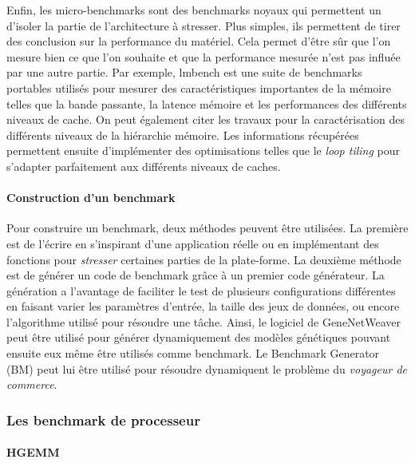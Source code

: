     Enfin, les micro-benchmarks sont des benchmarks noyaux qui permettent un d’isoler la partie de l’architecture à stresser. Plus simples, ils permettent de tirer des conclusion sur la performance du matériel. Cela permet d’être sûr que l’on mesure bien ce que l’on souhaite et que la performance mesurée n’est pas influée par une autre partie.
    Par exemple, lmbench \cite{HPC:lmbench} est une suite de benchmarks portables utilisés pour mesurer des caractéristiques importantes de la mémoire telles que la bande passante, la latence mémoire et les performances des différents niveaux de cache.
    On peut également citer les travaux \cite{Saavedra1995, gonzalez2010servet} pour la caractérisation des différents niveaux de la hiérarchie mémoire. Les informations récupérées permettent ensuite d'implémenter des optimisations telles que le \textit{loop tiling} pour s'adapter parfaitement aux différents niveaux de caches.



\paragraph{Construction d'un benchmark} Pour construire un benchmark, deux méthodes peuvent être utilisées. 
    La première est de l'écrire en s'inspirant d'une application réelle ou en implémentant des fonctions pour \textit{stresser} certaines parties de la plate-forme.
    La deuxième méthode est de générer un code de benchmark grâce à un premier code générateur. La génération a l'avantage de faciliter le test de plusieurs configurations différentes en faisant varier les paramètres d'entrée, la taille des jeux de données, ou encore l'algorithme utilisé pour résoudre une tâche. Ainsi, le logiciel de GeneNetWeaver \cite{schaffter2011genenetweaver} peut être utilisé pour générer dynamiquement des modèles génétiques pouvant ensuite eux même être utilisés comme benchmark. Le Benchmark Generator (BM) \cite{younes2003benchmark} peut lui être utilisé pour résoudre dynamiquent le problème du \textit{voyageur de commerce}.


\subsubsection{Les benchmark de processeur}


\paragraph{HGEMM}






